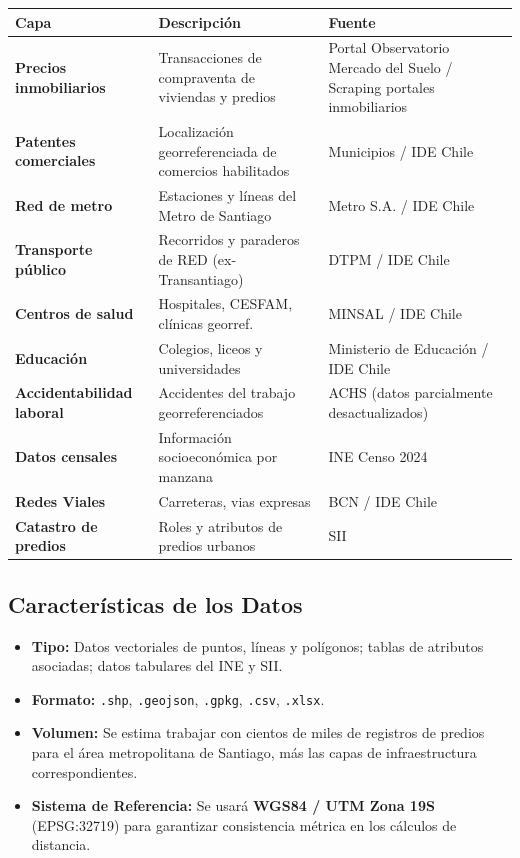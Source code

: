 \documentclass[12pt, letterpaper]{article}
\begin{document}
\vspace{0.5em}
\begin{center}
\begin{tabular}{>{\bfseries}p{4cm} p{4.5cm} p{4.5cm}}
\toprule
\textbf{Capa} & \textbf{Descripción} & \textbf{Fuente} \\
\midrule
Precios inmobiliarios & Transacciones de compraventa de viviendas y predios & Portal Observatorio Mercado del Suelo / Scraping portales inmobiliarios \\
\addlinespace
Patentes comerciales & Localización georreferenciada de comercios habilitados & Municipios / IDE Chile \\
\addlinespace
Red de metro & Estaciones y líneas del Metro de Santiago & Metro S.A. / IDE Chile \\
\addlinespace
Transporte público & Recorridos y paraderos de RED (ex-Transantiago) & DTPM / IDE Chile \\
\addlinespace
Centros de salud & Hospitales, CESFAM, clínicas georref. & MINSAL / IDE Chile \\
\addlinespace
Educación & Colegios, liceos y universidades & Ministerio de Educación / IDE Chile \\
\addlinespace
Accidentabilidad laboral & Accidentes del trabajo georreferenciados & ACHS (datos parcialmente desactualizados) \\
\addlinespace
Datos censales & Información socioeconómica por manzana & INE Censo 2024 \\
\addlinespace
Redes Viales & Carreteras, vias expresas & BCN / IDE Chile \\
\addlinespace
Catastro de predios & Roles y atributos de predios urbanos & SII \\
\bottomrule
\end{tabular}
\end{center}

\subsection{Características de los Datos}

\begin{itemize}[leftmargin=1.5em, itemsep=0.3em]
  \item \textbf{Tipo:} Datos vectoriales de puntos, líneas y polígonos; tablas
        de atributos asociadas; datos tabulares del INE y SII.
  \item \textbf{Formato:} \texttt{.shp}, \texttt{.geojson}, \texttt{.gpkg},
        \texttt{.csv}, \texttt{.xlsx}.
  \item \textbf{Volumen:} Se estima trabajar con cientos de miles de registros
        de predios para el área metropolitana de Santiago, más las capas de
        infraestructura correspondientes.
  \item \textbf{Sistema de Referencia:} Se usará \textbf{WGS84 / UTM Zona 19S}
        (EPSG:32719) para garantizar consistencia métrica en los cálculos de
        distancia.
\end{itemize}
\end{document}
